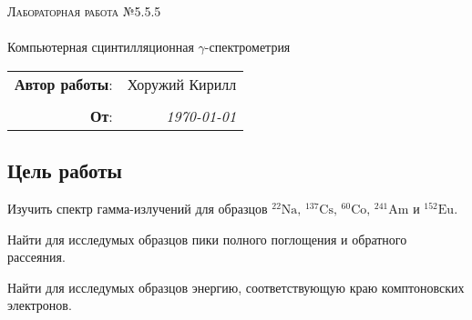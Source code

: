 
\phantom{42}
\vspace{20mm}

\begin{center}
    \LARGE \textsc{Лабораторная работа №5.5.5} \\ \phantom{42} \\ 
    Компьютерная сцинтилляционная $\gamma$-спектрометрия
    \vspace{3 mm}
    \large 
\end{center}


\phantom{42}

\begin{flushright}
    \begin{tabular}{rr}
        \textbf{Автор работы}: 
        & Хоружий Кирилл \\
        & \\
        \textbf{От}: &
        \textit{\today}\\
    \end{tabular}
\end{flushright}

\thispagestyle{empty}

\vspace{10mm}


\subsection*{Цель работы}
\begin{enumerate*}
    \item Изучить спектр гамма-излучений для образцов 
    $\mathrm{^{22}Na,\, ^{137}Cs,\,  ^{60}Co,\,  ^{241}Am}$ и $\mathrm{^{152}Eu}$. 
    \item Найти для исследумых образцов пики полного поглощения и обратного рассеяния.
    \item Найти для исследумых образцов энергию, соответствующую краю комптоновских электронов.
\end{enumerate*}






\newpage
